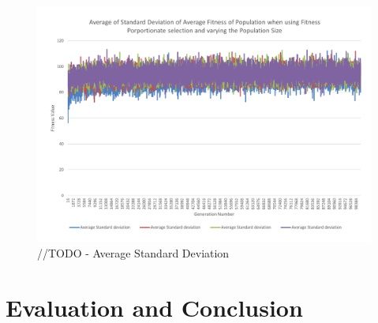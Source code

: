 \begin{figure}
	\centerline{\includegraphics[width=\paperwidth]{figures/CircleTests/CirclePopulationSizeControllAverageStandardDeviation.pdf}}
	\caption{//TODO - Average Standard Deviation}
\end{figure}


\clearpage
\section{Evaluation and Conclusion} %
\label{sec:evaluation_and_conclusion}


